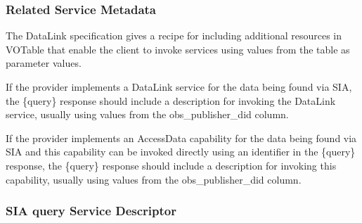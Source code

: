 \documentclass[11pt,a4paper]{ivoa}
\begin{document}
\subsubsection{Related Service Metadata}
The DataLink specification  gives a recipe for including additional resources in VOTable that enable the client to invoke services using values from the table as parameter values. 

If the provider implements a DataLink service for the data being found via SIA, the \{query\} response should include a description for invoking the DataLink service, usually using values from the obs\_publisher\_did column.
 
If the provider implements an AccessData capability for the data being found via SIA and this capability can be invoked directly using an identifier in the \{query\} response, the \{query\} response should include a description for invoking this capability, usually using values from the obs\_publisher\_did column.



\subsubsection{SIA {query} Service Descriptor}
\end{document}
